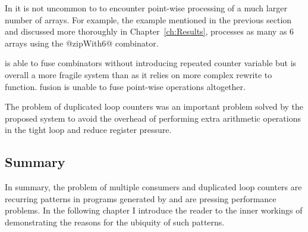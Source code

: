 \documentclass[preamble.tex]{subfiles}
\begin{document}
In \DPH\idph it is not uncommon to to encounter point-wise processing of a much larger number of arrays. For example, the \QuickHull example mentioned in the previous section and discussed more thoroughly in Chapter~\ref{ch:Results}, processes as many as 6 arrays using the @zipWith6@ combinator.

\ifaf is able to fuse  combinators without introducing repeated counter variable but is overall a more fragile system than \StreamFusion as it relies on more complex rewrite to function. \ishortcut fusion is unable to fuse point-wise operations altogether.

The problem of duplicated loop counters was an important problem solved by the proposed \LiveFusion system to avoid the overhead of performing extra arithmetic operations in the tight loop and reduce register pressure.



\subsection{Summary}

In summary, the problem of multiple consumers and duplicated loop counters are recurring patterns in programs generated by  and are pressing performance problems. In the following chapter I introduce the reader to the inner workings of  demonstrating the reasons for the ubiquity of such patterns.


\IfNotCompilingAll{\printbibliography}
\end{document}
